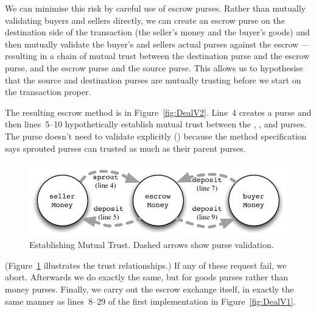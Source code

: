 We can minimise this risk by careful use of escrow purses. Rather than
mutually validating buyers and sellers directly, we can create an escrow
purse on the destination side of the transaction (the seller's money
and the buyer's goods) and then mutually validate the buyer's and
sellers actual purses against the escrow --- resulting in a chain of
mutual trust between the destination purse and the escrow purse, and
the escrow purse and the source purse. This allows us to hypothesise
that the source and destination purses are mutually trusting before we
start on the transaction proper.




The resulting escrow method is in
Figure~\ref{fig:DealV2}. Line~4 creates a 
purse and then lines~5--10 hypothetically establish mutual trust
between the , , and 
purses.   The  purse doesn't need to validate
  explicitly
() because the 
method specification says sprouted purses can trusted as much as their
parent purses.
%
\begin{figure}[h]
  \centering
  \includegraphics[scale=0.8]{mutual-trust-landscape.pdf}
  \vspace*{-4mm}
  \caption{Establishing Mutual Trust. Dashed arrows show purse validation.}
  \label{fig:mutual-trust}
\end{figure}
%
\noindent (Figure~\ref{fig:mutual-trust} illustrates the trust
relationships.)
If any of these
 request fail, we abort.
Afterwards we do exactly the same, but for goods purses rather than
money purses.  Finally, %
we carry out the escrow exchange
itself, in exactly the same manner as lines~8--29 of the first %
implementation
in Figure~\ref{fig:DealV1}.


\label{sec:VaildEscrow}


